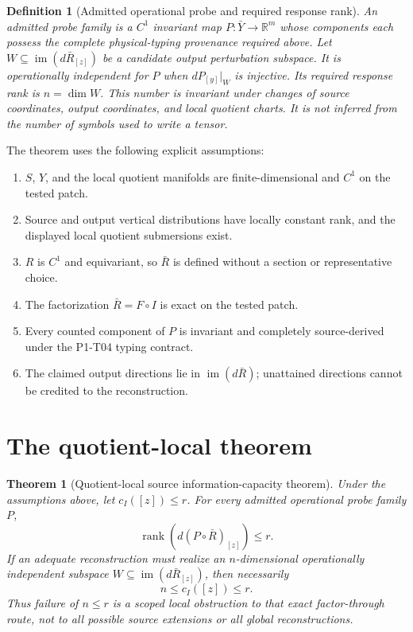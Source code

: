 \documentclass[11pt]{article}
\newtheorem{definition}{Definition}
\newtheorem{theorem}{Theorem}
\newcommand{\R}{\mathbb{R}}
\newcommand{\rank}{\operatorname{rank}}
\newcommand{\im}{\operatorname{im}}
\begin{document}
\begin{definition}[Admitted operational probe and required response rank]
An admitted probe family is a \(C^1\) invariant map
\(P:\bar Y\to\R^m\) whose components each possess the complete physical-typing
provenance required above.  Let \(W\subseteq\im(d\bar R_{[z]})\) be a candidate
output perturbation subspace.  It is operationally independent for \(P\) when
\(dP_{[y]}|_W\) is injective.  Its required response rank is
\(n=\dim W\).  This number is invariant under changes of source coordinates,
output coordinates, and local quotient charts.  It is not inferred from the
number of symbols used to write a tensor.
\end{definition}

The theorem uses the following explicit assumptions:
\begin{enumerate}
  \item \(S\), \(Y\), and the local quotient manifolds are finite-dimensional
        and \(C^1\) on the tested patch.
  \item Source and output vertical distributions have locally constant rank,
        and the displayed local quotient submersions exist.
  \item \(R\) is \(C^1\) and equivariant, so \(\bar R\) is defined without a
        section or representative choice.
  \item The factorization \(\bar R=F\circ I\) is exact on the tested patch.
  \item Every counted component of \(P\) is invariant and completely
        source-derived under the P1-T04 typing contract.
  \item The claimed output directions lie in \(\im(d\bar R)\); unattained
        directions cannot be credited to the reconstruction.
\end{enumerate}

\section{The quotient-local theorem}

\begin{theorem}[Quotient-local source information-capacity theorem]
\label{thm:capacity}
Under the assumptions above, let \(c_I([z])\leq r\).  For every admitted
operational probe family \(P\),
\[
 \rank\!\left(d(P\circ\bar R)_{[z]}\right)\leq r .
\]
If an adequate reconstruction must realize an \(n\)-dimensional
operationally independent subspace
\(W\subseteq\im(d\bar R_{[z]})\), then necessarily
\[
 n\leq c_I([z])\leq r .
\]
Thus failure of \(n\leq r\) is a scoped local obstruction to that exact
factor-through route, not to all possible source extensions or all global
reconstructions.
\end{theorem}
\end{document}
